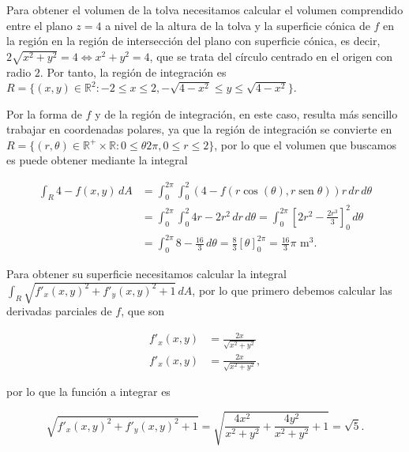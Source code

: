 \documentclass[
  spanish,
  a4paper,
]{scrreport}
\theoremstyle{definition}
\theoremstyle{remark}
\begin{document}
\begin{tcolorbox}[enhanced jigsaw, arc=.35mm, bottomrule=.15mm, bottomtitle=1mm, breakable, colback=white, colbacktitle=quarto-callout-tip-color!10!white, colframe=quarto-callout-tip-color-frame, coltitle=black, left=2mm, leftrule=.75mm, opacityback=0, opacitybacktitle=0.6, rightrule=.15mm, title=\textcolor{quarto-callout-tip-color}{\faLightbulb}\hspace{0.5em}{Solución}, titlerule=0mm, toprule=.15mm, toptitle=1mm]

Para obtener el volumen de la tolva necesitamos calcular el volumen
comprendido entre el plano \(z=4\) a nivel de la altura de la tolva y la
superficie cónica de \(f\) en la región en la región de intersección del
plano con superficie cónica, es decir,
\(2\sqrt{x^2+y^2} = 4 \Leftrightarrow x^2+y^2 = 4\), que se trata del
círculo centrado en el origen con radio \(2\). Por tanto, la región de
integración es
\(R=\{(x,y)\in\mathbb{R}^2: -2\leq x\leq 2, -\sqrt{4-x^2}\leq y\leq \sqrt{4-x^2}\}\).

Por la forma de \(f\) y de la región de integración, en este caso,
resulta más sencillo trabajar en coordenadas polares, ya que la región
de integración se convierte en
\(R=\{(r,\theta)\in \mathbb{R}^+\times\mathbb{R}: 0\leq \theta 2\pi, 0\leq r\leq 2\}\),
por lo que el volumen que buscamos es puede obtener mediante la integral

\begin{align*}
\int_R 4-f(x,y)\,dA 
&= \int_0^{2\pi}\int_0^2 (4-f(r\cos(\theta),r\operatorname{sen}{\theta}))r\,dr\,d\theta \\
&= \int_0^{2\pi}\int_0^2 4r-2r^2\,dr\,d\theta 
= \int_0^{2\pi} \left[2r^2-\frac{2r^3}{3}\right]_0^2\,d\theta \\
&= \int_0^{2\pi} 8-\frac{16}{3}\,d\theta 
= \frac{8}{3} [\theta]_0^{2\pi} 
= \frac{16}{3}\pi \mbox{ m}^3.
\end{align*}

Para obtener su superficie necesitamos calcular la integral
\(\int_R \sqrt{f'_x(x,y)^2+f'_y(x,y)^2+1}\,dA\), por lo que primero
debemos calcular las derivadas parciales de \(f\), que son

\begin{align*}
f'_x(x,y) &= \frac{2x}{\sqrt{x^2+y^2}} \\
f'_x(x,y) &= \frac{2x}{\sqrt{x^2+y^2}}, 
\end{align*}

por lo que la función a integrar es

\[
\sqrt{f'_x(x,y)^2+f'_y(x,y)^2+1} 
= \sqrt{\frac{4x^2}{x^2+y^2}+\frac{4y^2}{x^2+y^2}+1} 
= \sqrt{5}.
\]


\end{tcolorbox}
\end{document}
